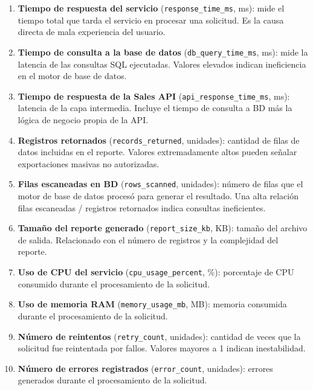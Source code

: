 \documentclass[12pt,letterpaper, oneside]{book}
\begin{document}
    \begin{enumerate}
        \item \textbf{Tiempo de respuesta del servicio} (\texttt{response\_time\_ms},
        ms): mide el tiempo total que tarda el servicio en procesar una
        solicitud. Es la causa directa de mala experiencia del usuario.

        \item \textbf{Tiempo de consulta a la base de datos}
        (\texttt{db\_query\_time\_ms}, ms): mide la latencia de las
        consultas SQL ejecutadas. Valores elevados indican ineficiencia
        en el motor de base de datos.

        \item \textbf{Tiempo de respuesta de la Sales API}
        (\texttt{api\_response\_time\_ms}, ms): latencia de la capa
        intermedia. Incluye el tiempo de consulta a BD más la lógica
        de negocio propia de la API.

        \item \textbf{Registros retornados} (\texttt{records\_returned},
        unidades): cantidad de filas de datos incluidas en el reporte.
        Valores extremadamente altos pueden señalar exportaciones masivas
        no autorizadas.

        \item \textbf{Filas escaneadas en BD} (\texttt{rows\_scanned},
        unidades): número de filas que el motor de base de datos procesó
        para generar el resultado. Una alta relación filas escaneadas /
        registros retornados indica consultas ineficientes.

        \item \textbf{Tamaño del reporte generado} (\texttt{report\_size\_kb},
        KB): tamaño del archivo de salida. Relacionado con el número de
        registros y la complejidad del reporte.

        \item \textbf{Uso de CPU del servicio} (\texttt{cpu\_usage\_percent},
        \%): porcentaje de CPU consumido durante el procesamiento de la
        solicitud.

        \item \textbf{Uso de memoria RAM} (\texttt{memory\_usage\_mb}, MB):
        memoria consumida durante el procesamiento de la solicitud.

        \item \textbf{Número de reintentos} (\texttt{retry\_count},
        unidades): cantidad de veces que la solicitud fue reintentada
        por fallos. Valores mayores a 1 indican inestabilidad.

        \item \textbf{Número de errores registrados} (\texttt{error\_count},
        unidades): errores generados durante el procesamiento de la
        solicitud.
    \end{enumerate}
\end{document}
